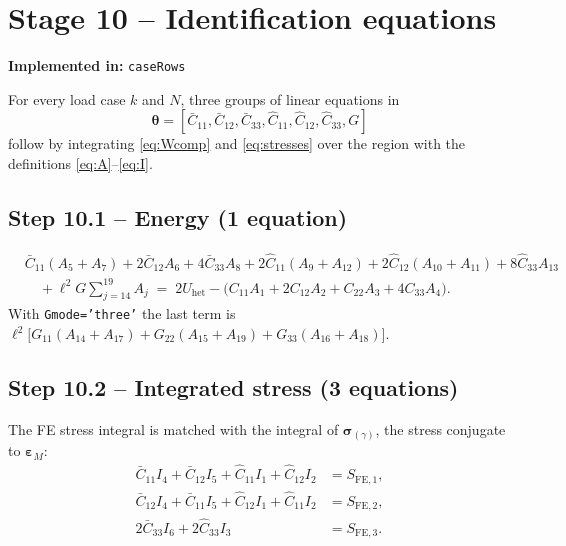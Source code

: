 \documentclass[11pt,a4paper]{article}
\newcommand{\epsM}{\bm{\varepsilon}_{M}}
\newcommand{\bsig}{\bm{\sigma}}
\newcommand{\bth}{\bm{\theta}}
\newcommand{\code}[1]{\texttt{#1}}
\theoremstyle{plain}
\theoremstyle{remark}
\newcommand{\implementedin}[1]{\begin{codebox}\textbf{Implemented in:} #1\end{codebox}}
\begin{document}
\section{Stage 10 -- Identification equations}
\label{sec:stage10}
\implementedin{\code{caseRows}}
For every load case $k$ and $N$, three groups of linear equations in
\[
  \bth=[\bar C_{11},\bar C_{12},\bar C_{33},\hat C_{11},\hat C_{12},\hat C_{33},G]
\]
follow by integrating \eqref{eq:Wcomp} and \eqref{eq:stresses} over the region with the definitions
\eqref{eq:A}--\eqref{eq:I}.

\subsection*{Step 10.1 -- Energy (1 equation)}
\begin{equation}
  \boxed{
  \begin{aligned}
  &\bar C_{11}(A_5+A_7)+2\bar C_{12}A_6+4\bar C_{33}A_8
  +2\hat C_{11}(A_9+A_{12})+2\hat C_{12}(A_{10}+A_{11})+8\hat C_{33}A_{13}\\
  &\quad+\ell^2G\sum_{j=14}^{19}A_j
  \;=\;2U_{\mathrm{het}}-\big(C_{11}A_1+2C_{12}A_2+C_{22}A_3+4C_{33}A_4\big).
  \end{aligned}}
  \label{eq:eqE}
\end{equation}
With \code{Gmode='three'} the last term is
$\ell^2\big[G_{11}(A_{14}+A_{17})+G_{22}(A_{15}+A_{19})+G_{33}(A_{16}+A_{18})\big]$.

\subsection*{Step 10.2 -- Integrated stress (3 equations)}
The FE stress integral is matched with the integral of $\bsig_{(\gamma)}$, the stress conjugate to
$\epsM$:
\begin{equation}
  \boxed{
  \begin{aligned}
  \bar C_{11}I_4+\bar C_{12}I_5+\hat C_{11}I_1+\hat C_{12}I_2&=S_{\mathrm{FE},1},\\
  \bar C_{12}I_4+\bar C_{11}I_5+\hat C_{12}I_1+\hat C_{11}I_2&=S_{\mathrm{FE},2},\\
  2\bar C_{33}I_6+2\hat C_{33}I_3&=S_{\mathrm{FE},3}.
  \end{aligned}}
  \label{eq:eqS}
\end{equation}
\end{document}
